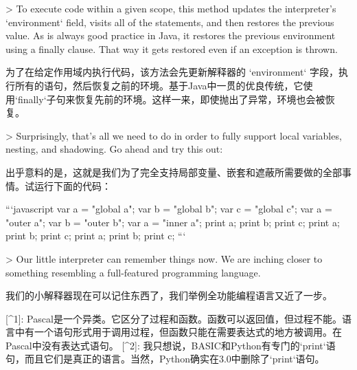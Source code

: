 \documentclass[cn,11pt,chinese]{elegantbook}
\begin{document}
{> To execute code within a given scope, this method updates the interpreter’s `environment` field, visits all of the statements, and then restores the previous value. As is always good practice in Java, it restores the previous environment using a finally clause. That way it gets restored even if an exception is thrown.

为了在给定作用域内执行代码，该方法会先更新解释器的 `environment` 字段，执行所有的语句，然后恢复之前的环境。基于Java中一贯的优良传统，它使用`finally`子句来恢复先前的环境。这样一来，即使抛出了异常，环境也会被恢复。

> Surprisingly, that’s all we need to do in order to fully support local variables, nesting, and shadowing. Go ahead and try this out:

出乎意料的是，这就是我们为了完全支持局部变量、嵌套和遮蔽所需要做的全部事情。试运行下面的代码：

```javascript
var a = "global a";
var b = "global b";
var c = "global c";
{
  var a = "outer a";
  var b = "outer b";
  {
    var a = "inner a";
    print a;
    print b;
    print c;
  }
  print a;
  print b;
  print c;
}
print a;
print b;
print c;
```

> Our little interpreter can remember things now. We are inching closer to something resembling a full-featured programming language.

我们的小解释器现在可以记住东西了，我们举例全功能编程语言又近了一步。



[^1]: Pascal是一个异类。它区分了过程和函数。函数可以返回值，但过程不能。语言中有一个语句形式用于调用过程，但函数只能在需要表达式的地方被调用。在Pascal中没有表达式语句。
[^2]: 我只想说，BASIC和Python有专门的`print`语句，而且它们是真正的语言。当然，Python确实在3.0中删除了`print`语句。

}
\end{document}
